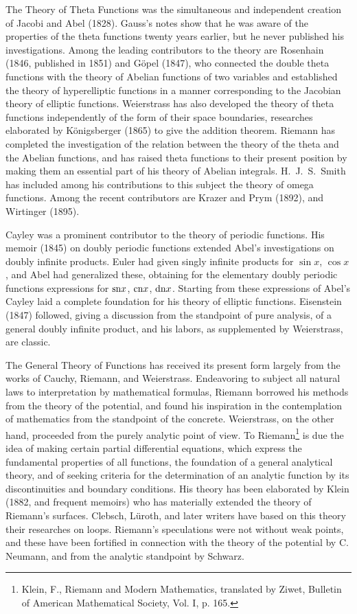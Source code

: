 \documentclass[oneside]{book}
\begin{document}
{The Theory of Theta Functions was the simultaneous and independent
creation of Jacobi and Abel (1828). Gauss's notes show that he was
aware of the properties of the theta functions twenty years earlier,
but he never published his investigations. Among the leading
contributors to the theory are Rosenhain (1846, published in 1851)
and G\"opel (1847), who connected the double theta functions with
the theory of Abelian functions of two variables and established the
theory of hyperelliptic functions in a manner corresponding to the
Jacobian theory of elliptic functions. Weierstrass has also
developed the theory of theta functions independently of the form of
their space boundaries, researches elaborated by K\"onigsberger
(1865) to give the addition theorem. Riemann has completed the
investigation of the relation between the theory of the theta and
the Abelian functions, and has raised theta functions to their
present position by making them an essential part of his theory of
Abelian integrals. H.~J.~S.~Smith has included among his
contributions to this subject the theory of omega functions. Among
the recent contributors are Krazer and Prym (1892), and Wirtinger
(1895).

Cayley was a prominent contributor to the theory of periodic
functions. His memoir (1845) on doubly periodic functions extended
Abel's investigations on doubly infinite products. Euler had given
singly infinite products for $\sin x$, $\cos x$, and Abel had
generalized these, obtaining for the elementary doubly periodic
functions expressions for $\hbox{sn} x$, $\hbox{cn} x$, $\hbox{dn}
x$. Starting from these expressions of Abel's Cayley laid a complete
foundation for his theory of elliptic functions. Eisenstein (1847)
followed, giving a discussion from the standpoint of pure analysis,
of a general doubly infinite product, and his labors, as
supplemented by Weierstrass, are classic.

The General Theory of Functions has received its present form
largely from the works of Cauchy, Riemann, and
Weierstrass. Endeavoring to subject all natural laws to
interpretation by mathematical formulas, Riemann borrowed his
methods from the theory of the potential, and found his inspiration
in the contemplation of mathematics from the standpoint of the
concrete. Weierstrass, on the other hand, proceeded from the purely
analytic point of view. To Riemann\footnote{Klein, F., Riemann and
Modern Mathematics, translated by Ziwet, Bulletin of American
Mathematical Society, Vol. I, p. 165.} is due the idea of making
certain partial differential equations, which express the
fundamental properties of all functions, the foundation of a general
analytical theory, and of seeking criteria for the determination of
an analytic function by its discontinuities and boundary
conditions. His theory has been elaborated by Klein (1882, and
frequent memoirs) who has materially extended the theory of
Riemann's surfaces. Clebsch, L\"uroth, and later writers have based on
this theory their researches on loops. Riemann's speculations were
not without weak points, and these have been fortified in connection
with the theory of the potential by C. Neumann, and from the
analytic standpoint by Schwarz.

}
\end{document}
